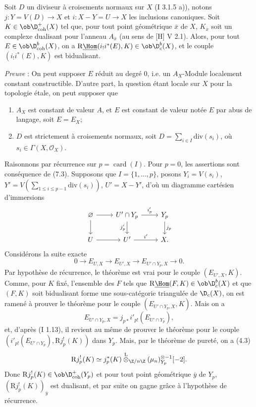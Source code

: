 Soit $D$ un diviseur à croisements normaux sur $X$ (I 3.1.5 a)), notons $j:Y=V(D)\to X$ et $i:X-Y=U\to X$ les inclusions canoniques. Soit $K\in\ob\D^{+}_{\mathrm{coh}}(X)$ tel que, pour tout point géométrique $\bar{x}$ de $X$, $K_{\bar{x}}$ soit un complexe dualisant pour l'anneau $A_{\bar{x}}$ (au sens de [H] V 2.1). Alors, pour tout $E\in\ob\D^{b}_{\mathrm{coh}}(X)$, on a $\mathrm{R}\underline{\Hom}(i_!i^*(E),K)\in\ob\D^{b}_{c}(X)$, et le couple $(i_!i^*(E),K)$ est bidualisant.

\emph{Preuve} : On peut supposer $E$ réduit au degré $0$, i.e. un $A_X$-Module localement constant constructible. D'autre part, la question étant locale sur $X$ pour la topologie étale, on peut supposer que
\begin{enumerate}[label=(\alph*)]
\item $A_X$ est constant de valeur $A$, et $E$ est constant de valeur notée $E$ par abus de langage, soit $E=E_X$;
\item $D$ est strictement à croisements normaux, soit $D=\sum_{i\in I}\mathrm{div}(s_i)$, où $s_i\in\Gamma(X,\mathcal{O}_X)$.
\end{enumerate}
Raisonnons par récurrence sur $p=\operatorname{card}(I)$. Pour $p=0$, les assertions sont conséquence de (7.3). Supposons que $I=\{1,\ldots,p\}$, posons $Y_i=V(s_i)$, $Y'=V(\sum_{1\leq i\leq p-1}\mathrm{div}(s_i))$, $U'=X-Y'$, d'où un diagramme cartésien d'immersions
\[
\begin{tikzcd}
\varnothing \arrow[r] \arrow[d] & U'\cap Y_p \arrow[r,"i'_p"] \arrow[d,"j'_p"'] & Y_p \arrow[d,"j_p"]\\
U \arrow[r] & U' \arrow[r,"i'"] & X.
\end{tikzcd}
\]
Considérons la suite exacte
\[
        0\longrightarrow E_{U,X}\longrightarrow E_{U',X}\longrightarrow E_{U'\cap Y_p,X}\longrightarrow0.
\]
Par hypothèse de
récurrence, le théorème est vrai pour le couple $(E_{U',X},K)$. Comme, pour $K$ fixé, l'ensemble des $F$ tels que $\mathrm{R}\underline{\Hom}(F,K)\in\ob\D_c^b(X)$ et que $(F,K)$ soit bidualisant forme une sous-catégorie triangulée de $\D_c(X)$, on est ramené à prouver le théorème pour le couple $(E_{U'\cap Y_p,X},K)$. Mais on a
\[
        E_{U'\cap Y_p,X}=j_{p*}i'_{p!}(E_{U'\cap Y_p}),
\]
et, d'après (I 1.13), il revient au même de prouver le théorème pour le couple $(i'_{p!}(E_{U'\cap Y_p}),\mathrm{R} j_p^!(K))$ dans $Y_p$. Mais, par le théorème de pureté, on a (4.3)
\[
        \mathrm{R} j_p^!(K)\simeq j_p^*(K)\overset{\mathrm{L}}{\otimes}_{\Z/n\Z}(\mu_n)_{Y_p}^{\otimes -1}[-2].
\]
Donc $\mathrm{R} j_p^!(K)\in\ob\D^{+}_{\mathrm{coh}}(Y_p)$ et pour tout point géométrique $\bar{y}$ de $Y_p$, $(\mathrm{R} j_p^!(K))_{\bar{y}}$ est dualisant, et par suite on gagne grâce à l'hypothèse de récurrence.

